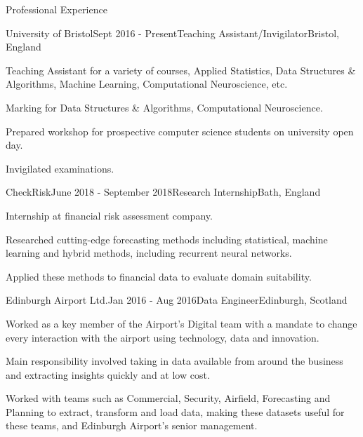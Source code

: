 \documentclass{resume} %
\begin{document}

\begin{rSection}{Professional Experience}

  \begin{rSubsection}{University of Bristol}{Sept 2016 - Present}{Teaching Assistant/Invigilator}{Bristol, England}
    \item Teaching Assistant for a variety of courses, Applied Statistics, Data Structures \& Algorithms, Machine Learning, Computational Neuroscience, etc.
    \item Marking for Data Structures \& Algorithms, Computational Neuroscience.
    \item Prepared workshop for prospective computer science students on university open day.
    \item Invigilated examinations.
  \end{rSubsection}

  \begin{rSubsection}{CheckRisk}{June 2018 - September 2018}{Research Internship}{Bath, England}
    \item Internship at financial risk assessment company. 
    \item Researched cutting-edge forecasting methods including statistical, machine learning and hybrid methods, including recurrent neural networks. 
    \item Applied these methods to financial data to evaluate domain suitability.
  \end{rSubsection}

  \begin{rSubsection}{Edinburgh Airport Ltd.}{Jan 2016 - Aug 2016}{Data Engineer}{Edinburgh, Scotland}
    \item Worked as a key member of the Airport's Digital team with a mandate to change every interaction with the airport using technology, data and innovation.
    \item Main responsibility involved taking in data available from around the business and extracting insights quickly and at low cost.
    \item Worked with teams such as Commercial, Security, Airfield, Forecasting and Planning to extract, transform and load data, making these datasets useful for these teams, and Edinburgh Airport’s senior management.
  \end{rSubsection}


\end{rSection}
\end{document}

